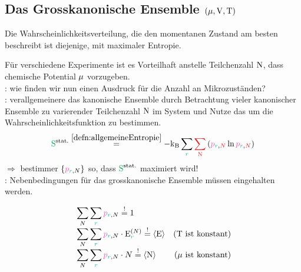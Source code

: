 \subsection{Das Grosskanonische Ensemble $(\mathrm{\mu},\mathrm{V},\mathrm{T})$}
\label{subsec:DasGrosskanonischeEnsemble}
\begin{princpbox}
  \begin{princip}
    Die Wahrscheinlichkeitsverteilung, die den momentanen Zustand am
    besten beschreibt ist diejenige, mit maximaler Entropie.
  \end{princip}
\end{princpbox}
\begin{sectionbox}[Problem]\nospacing
  \begin{wrapfigure}{r}{0.55\linewidth}	
  \end{wrapfigure}
 Für verschiedene Experimente ist es Vorteilhaft anstelle Teilchenzahl
 $\mathrm{N}$, dass chemische Potential $\mathrm{\mu}$ vorzugeben.\\
 : wie finden wir nun einen Ausdruck für die Anzahl an Mikrozuständen?\\
 : verallgemeinere das kanonische Ensemble durch Betrachtung
 vieler kanonischer Ensemble zu varierender Teilchenzahl $\mathrm{N}$ im System und Nutze das  um die
 Wahrscheinlichkeitsfunktion zu bestimmen.
 \begin{equation*}
   \Spots\eqs{\cref{defn:allgemeineEntropie}}-\kb\sum_{\idxr}\rd{\sum_{\Nz}}\left(\pb_{\idxr,\rd{N}}\ln\pb_{\idxr,\rd{N}}\right)
 \end{equation*}
 $\Rightarrow$ bestimmer $\{\pbrN\}$ so, dass $\Spots$ maximiert wird!\\
 : Nebenbedingungen für das grosskanonische Ensemble müssen eingehalten werden.
\end{sectionbox}
\begin{sectionbox}[Nebenbedingungen]\nospacing
  \begin{align*}
    &\sum_{N}\sum_{\idxr}\pbrN\eqs{!}1\nalign
    &\sum_{N}\sum_{\idxr}\pbrN\cdot\Ezr^{(N)}\eqs{!}\obs{\Ez}&(\Tz \text{ ist konstant})\nalign
    &\sum_{N}\sum_{\idxr}\pbrN\cdot N\eqs{!}\obs{\Nz}&(\muz \text{ ist konstant})
  \end{align*}
\end{sectionbox}
